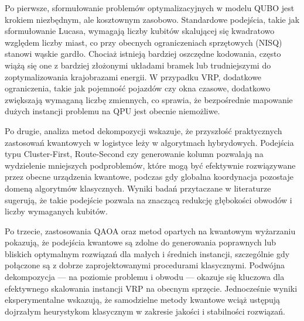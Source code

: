 Po pierwsze, sformułowanie problemów optymalizacyjnych w modelu QUBO jest krokiem niezbędnym, ale kosztownym zasobowo. Standardowe podejścia, takie jak sformułowanie Lucasa, wymagają liczby kubitów skalującej się kwadratowo względem liczby miast, co przy obecnych ograniczeniach sprzętowych (NISQ) stanowi wąskie gardło. Chociaż istnieją bardziej oszczędne kodowania, często wiążą się one z bardziej złożonymi układami bramek lub trudniejszymi do zoptymalizowania krajobrazami energii. W przypadku VRP, dodatkowe ograniczenia, takie jak pojemność pojazdów czy okna czasowe, dodatkowo zwiększają wymaganą liczbę zmiennych, co sprawia, że bezpośrednie mapowanie dużych instancji problemu na QPU jest obecnie niemożliwe.

Po drugie, analiza metod dekompozycji wskazuje, że przyszłość praktycznych zastosowań kwantowych w logistyce leży w algorytmach hybrydowych. Podejścia typu Cluster-First, Route-Second czy generowanie kolumn pozwalają na wydzielenie mniejszych podproblemów, które mogą być efektywnie rozwiązywane przez obecne urządzenia kwantowe, podczas gdy globalna koordynacja pozostaje domeną algorytmów klasycznych. Wyniki badań przytaczane w literaturze sugerują, że takie podejście pozwala na znaczącą redukcję głębokości obwodów i liczby wymaganych kubitów.

Po trzecie, zastosowania QAOA oraz metod opartych na kwantowym wyżarzaniu pokazują, że podejścia kwantowe są zdolne do generowania poprawnych lub bliskich optymalnym rozwiązań dla małych i średnich instancji, szczególnie gdy połączone są z dobrze zaprojektowanymi procedurami klasycznymi. Podwójna dekompozycja — na poziomie problemu i obwodu — okazuje się kluczowa dla efektywnego skalowania instancji VRP na obecnym sprzęcie. Jednocześnie wyniki eksperymentalne wskazują, że samodzielne metody kwantowe wciąż ustępują dojrzałym heurystykom klasycznym w zakresie jakości i stabilności rozwiązań.



